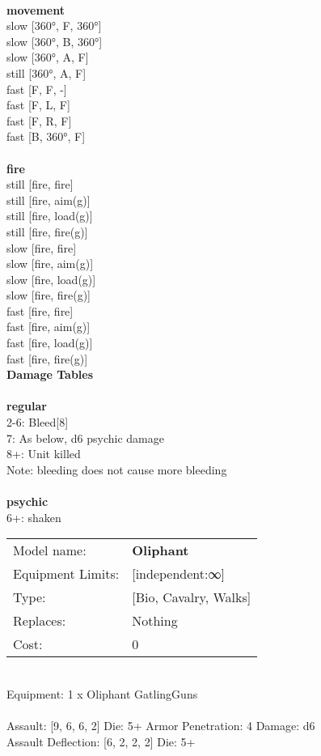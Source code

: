 \ \\ {\bf movement } \\
slow [360°, F, 360°] \\
slow [360°, B, 360°] \\
slow [360°, A, F] \\
still [360°, A, F] \\
fast [F, F, -] \\
fast [F, L, F] \\
fast [F, R, F] \\
fast [B, 360°, F] \\
\ \\ {\bf fire } \\
still [fire, fire] \\
still [fire, aim(g)] \\
still [fire, load(g)] \\
still [fire, fire(g)] \\
slow [fire, fire] \\
slow [fire, aim(g)] \\
slow [fire, load(g)] \\
slow [fire, fire(g)] \\
fast [fire, fire] \\
fast [fire, aim(g)] \\
fast [fire, load(g)] \\
fast [fire, fire(g)] \\


{\bf Damage Tables} \\
\ \\ {\bf regular } \\
2-6: Bleed[8]  \\
7: As below, d6 psychic damage \\
8+: Unit killed \\
Note: bleeding does not cause more bleeding \\
\ \\ {\bf psychic } \\
6+: shaken \\


\noindent
\begin{tabular}{ll}
Model name: &{\bf Oliphant } \\
Equipment Limits: &[independent:∞] \\
Type: &[Bio, Cavalry, Walks] \\
Replaces: &Nothing \\
Cost: & 0\\
\end{tabular}
\ \\
Equipment: 1 x Oliphant GatlingGuns \\
\ \\
Assault: [9, 6, 6, 2] Die: 5+ Armor Penetration: 4 Damage: d6 \\
Assault Deflection: [6, 2, 2, 2] Die: 5+\\
\indent  
\ \\

